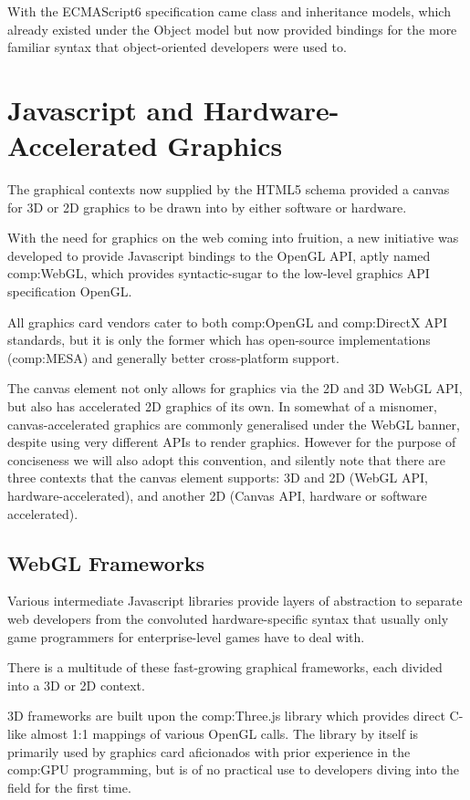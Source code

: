 With the ECMAScript6 specification came class and inheritance models, which already existed under the Object model but now provided bindings for the more familiar syntax that object-oriented developers were used to.


\section{Javascript and Hardware-Accelerated Graphics}

The graphical contexts now supplied by the HTML5 schema provided a canvas for 3D or 2D graphics to be drawn into by either software or hardware.

With the need for graphics on the web coming into fruition, a new initiative was developed to provide Javascript bindings to the OpenGL API\citep{opengl}, aptly named \gls{comp:WebGL}\citep{webgl}, which provides syntactic-sugar to the low-level graphics API specification OpenGL.

All graphics card vendors cater to both \gls{comp:OpenGL} and \gls{comp:DirectX} API standards\citep{directx}, but it is only the former which has open-source implementations (\gls{comp:MESA}) and generally better cross-platform support. 

The canvas element not only allows for graphics via the 2D and 3D WebGL API, but also has accelerated 2D graphics of its own. In somewhat of a misnomer, canvas-accelerated graphics are commonly generalised under the WebGL banner, despite using very different APIs to render graphics. However for the purpose of conciseness we will also adopt this convention, and silently note that there are three contexts that the canvas element supports: 3D and 2D (WebGL API, hardware-accelerated), and another 2D (Canvas API, hardware or software accelerated).


\subsection{WebGL Frameworks}

Various intermediate Javascript libraries provide layers of abstraction to separate web developers from the convoluted hardware-specific syntax that usually only game programmers for enterprise-level games have to deal with.

There is a multitude of these fast-growing graphical frameworks, each divided into a 3D or 2D context. 

3D frameworks are built upon the \gls{comp:Three.js} library which provides direct C-like almost 1:1 mappings of various OpenGL calls. The library by itself is primarily used by graphics card aficionados with prior experience in the \gls{comp:GPU} programming, but is of no practical use to developers diving into the field for the first time. 

